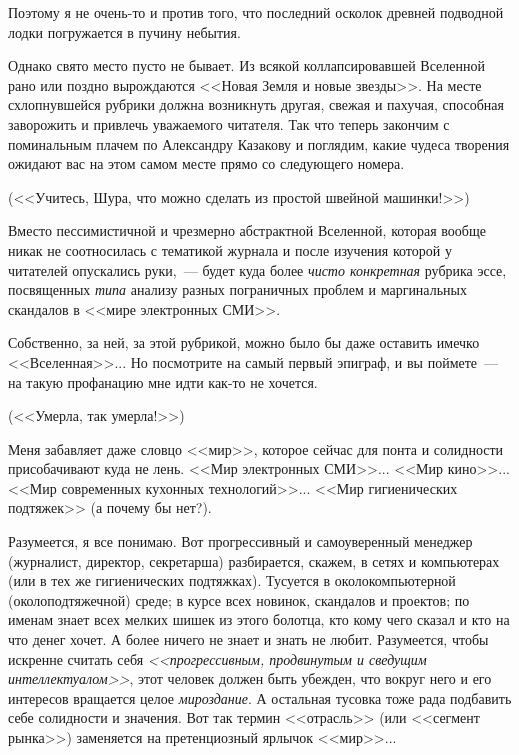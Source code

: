 \documentclass{scrbook}
\newcommand{\flqq}{<<}
\newcommand{\frqq}{>>}
\newcommand{\mdash}{~--- }
\newcommand{\commamdash}{~--- } %
\begin{document}
Поэтому я не очень-то и против того, что последний осколок древней подводной лодки погружается в пучину небытия.

Однако свято место пусто не бывает. Из всякой коллапсировавшей Вселенной рано или поздно вырождаются {\flqq}Новая Земля и новые звезды{\frqq}. На месте схлопнувшейся рубрики должна возникнуть другая, свежая и пахучая, способная заворожить и привлечь уважаемого читателя. Так что теперь закончим с поминальным плачем по Александру Казакову и поглядим, какие чудеса творения ожидают вас на этом самом месте прямо со следующего номера.

({\flqq}Учитесь, Шура, что можно сделать из простой швейной машинки!{\frqq})

Вместо пессимистичной и чрезмерно абстрактной Вселенной, которая вообще никак не соотносилась с тематикой журнала и после изучения которой у читателей опускались руки,{\commamdash}будет куда более \emph{чисто конкретная} рубрика эссе, посвященных \emph{типа} анализу разных пограничных проблем и маргинальных скандалов в {\flqq}мире электронных СМИ{\frqq}.

Собственно, за ней, за этой рубрикой, можно было бы даже оставить имечко {\flqq}Вселенная{\frqq}... Но посмотрите на самый первый эпиграф, и вы поймете{\mdash}на такую профанацию мне идти как-то не хочется.

({\flqq}Умерла, так умерла!{\frqq})

Меня забавляет даже словцо {\flqq}мир{\frqq}, которое сейчас для понта и солидности присобачивают куда не лень. {\flqq}Мир электронных СМИ{\frqq}... {\flqq}Мир кино{\frqq}... {\flqq}Мир современных кухонных технологий{\frqq}... {\flqq}Мир гигиенических подтяжек{\frqq} (а почему бы нет?).

Разумеется, я все понимаю. Вот прогрессивный и самоуверенный менеджер (журналист, директор, секретарша) разбирается, скажем, в сетях и компьютерах (или в тех же гигиенических подтяжках). Тусуется в околокомпьютерной (околоподтяжечной) среде; в курсе всех новинок, скандалов и проектов; по именам знает всех мелких шишек из этого болотца, кто кому чего сказал и кто на что денег хочет. А более ничего не знает и знать не любит. Разумеется, чтобы искренне считать себя \emph{{\flqq}прогрессивным, продвинутым и сведущим интеллектуалом{\frqq}}, этот человек должен быть убежден, что вокруг него и его интересов вращается целое \emph{мироздание}. А остальная тусовка тоже рада подбавить себе солидности и значения. Вот так термин {\flqq}отрасль{\frqq} (или {\flqq}сегмент рынка{\frqq}) заменяется на претенциозный ярлычок {\flqq}мир{\frqq}...
\end{document}
